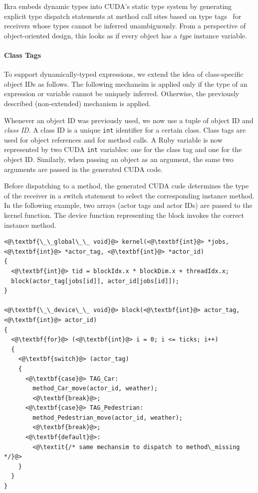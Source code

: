 \documentclass[preprint]{sigplanconf}
\begin{document}
Ikra embeds dynamic types into CUDA's static type system by generating explicit type dispatch statements at method call sites based on type tags~\cite{Abadi:1989:DTS:75277.75296} for receivers whose types cannot be inferred unambiguously. From a perspective of object-oriented design, this looks as if every object has a \emph{type} instance variable.

\paragraph{Class Tags}
To support dynamically-typed expressions, we extend the idea of class-specific object IDs as follows. The following mechansim is applied only if the type of an expression or variable cannot be uniquely inferred. Otherwise, the previously described (non-extended) mechanism is applied. 

Whenever an object ID was previously used, we now use a tuple of object ID and \emph{class ID}. A class ID is a unique \texttt{int} identifier for a certain class. Class tags are used for object references and for method calls. A Ruby variable is now represented by two CUDA \texttt{int} variables: one for the class tag and one for the object ID. Similarly, when passing an object as an argument, the same two arguments are passed in the generated CUDA code.

Before dispatching to a method, the generated CUDA cude determines the type of the receiver in a switch statement to select the corresponding instance method. In the following example, two arrays (actor tags and actor IDs) are passed to the kernel function. The device function representing the block invokes the correct instance method.

\lstset{language=C++}
\begin{lstlisting}
<@\textbf{\_\_global\_\_ void}@> kernel(<@\textbf{int}@> *jobs, <@\textbf{int}@> *actor_tag, <@\textbf{int}@> *actor_id)
{
  <@\textbf{int}@> tid = blockIdx.x * blockDim.x + threadIdx.x;
  block(actor_tag[jobs[id]], actor_id[jobs[id]]);
}

<@\textbf{\_\_device\_\_ void}@> block(<@\textbf{int}@> actor_tag, <@\textbf{int}@> actor_id)
{
  <@\textbf{for}@> (<@\textbf{int}@> i = 0; i <= ticks; i++)
  {
    <@\textbf{switch}@> (actor_tag)
    {
      <@\textbf{case}@> TAG_Car:
        method_Car_move(actor_id, weather);
        <@\textbf{break}@>;
      <@\textbf{case}@> TAG_Pedestrian:
        method_Pedestrian_move(actor_id, weather);
        <@\textbf{break}@>;
      <@\textbf{default}@>:
        <@\textit{/* same mechansim to dispatch to method\_missing */}@>
    }
  }
}
\end{lstlisting}
\end{document}
